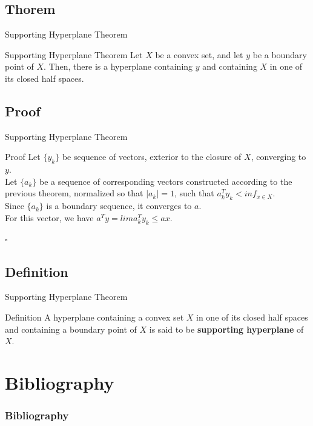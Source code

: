 \documentclass{beamer}
\begin{document}
\subsection{Thorem}
\begin{frame}{Supporting Hyperplane Theorem}
\begin{block}{Supporting Hyperplane Theorem}
Let $X$ be a convex set, and let $y$ be a boundary point of $X$. Then, there is a hyperplane containing $y$ and containing $X$ in one of its closed half spaces.
\end{block}
\end{frame}

\subsection{Proof}
\begin{frame}{Supporting Hyperplane Theorem}
\begin{block}{Proof \cite{1}}
Let $\lbrace y_k \rbrace$ be sequence of vectors, exterior to the closure of $X$, converging to $y$. \\
Let $\lbrace a_k \rbrace$ be a sequence of corresponding vectors constructed according to the previous theorem, normalized so that $|a_k| = 1$, such that $a_k^T y_k < inf_{x \in X}.$ \\
Since $\lbrace a_k \rbrace$ is a boundary sequence, it converges to $a$. \\
For this vector, we have $a^T y = lim a_k^T y_k \leq a x.$
\begin{flushright}$\square$\end{flushright}
\end{block}
\end{frame}

\subsection{Definition}
\begin{frame}{Supporting Hyperplane Theorem}
\begin{block}{Definition} 
A hyperplane containing a convex set $X$ in one of its closed half spaces and containing a boundary point of $X$ is said to be \textbf{supporting hyperplane} of $X$.
\end{block}
\end{frame}

\section{Bibliography}
\begin{frame}[allowframebreaks]
\frametitle{Bibliography}
    \tiny{ }
    
\end{frame}
\end{document}
